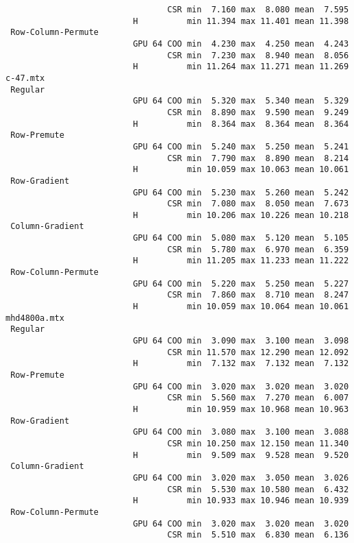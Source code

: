 {\begin{verbatim}
                                 CSR min  7.160 max  8.080 mean  7.595
                          H          min 11.394 max 11.401 mean 11.398
 Row-Column-Permute
                          GPU 64 COO min  4.230 max  4.250 mean  4.243
                                 CSR min  7.230 max  8.940 mean  8.056
                          H          min 11.264 max 11.271 mean 11.269
c-47.mtx
 Regular
                          GPU 64 COO min  5.320 max  5.340 mean  5.329
                                 CSR min  8.890 max  9.590 mean  9.249
                          H          min  8.364 max  8.364 mean  8.364
 Row-Premute
                          GPU 64 COO min  5.240 max  5.250 mean  5.241
                                 CSR min  7.790 max  8.890 mean  8.214
                          H          min 10.059 max 10.063 mean 10.061
 Row-Gradient
                          GPU 64 COO min  5.230 max  5.260 mean  5.242
                                 CSR min  7.080 max  8.050 mean  7.673
                          H          min 10.206 max 10.226 mean 10.218
 Column-Gradient
                          GPU 64 COO min  5.080 max  5.120 mean  5.105
                                 CSR min  5.780 max  6.970 mean  6.359
                          H          min 11.205 max 11.233 mean 11.222
 Row-Column-Permute
                          GPU 64 COO min  5.220 max  5.250 mean  5.227
                                 CSR min  7.860 max  8.710 mean  8.247
                          H          min 10.059 max 10.064 mean 10.061
mhd4800a.mtx
 Regular
                          GPU 64 COO min  3.090 max  3.100 mean  3.098
                                 CSR min 11.570 max 12.290 mean 12.092
                          H          min  7.132 max  7.132 mean  7.132
 Row-Premute
                          GPU 64 COO min  3.020 max  3.020 mean  3.020
                                 CSR min  5.560 max  7.270 mean  6.007
                          H          min 10.959 max 10.968 mean 10.963
 Row-Gradient
                          GPU 64 COO min  3.080 max  3.100 mean  3.088
                                 CSR min 10.250 max 12.150 mean 11.340
                          H          min  9.509 max  9.528 mean  9.520
 Column-Gradient
                          GPU 64 COO min  3.020 max  3.050 mean  3.026
                                 CSR min  5.530 max 10.580 mean  6.432
                          H          min 10.933 max 10.946 mean 10.939
 Row-Column-Permute
                          GPU 64 COO min  3.020 max  3.020 mean  3.020
                                 CSR min  5.510 max  6.830 mean  6.136

\end{verbatim}}
